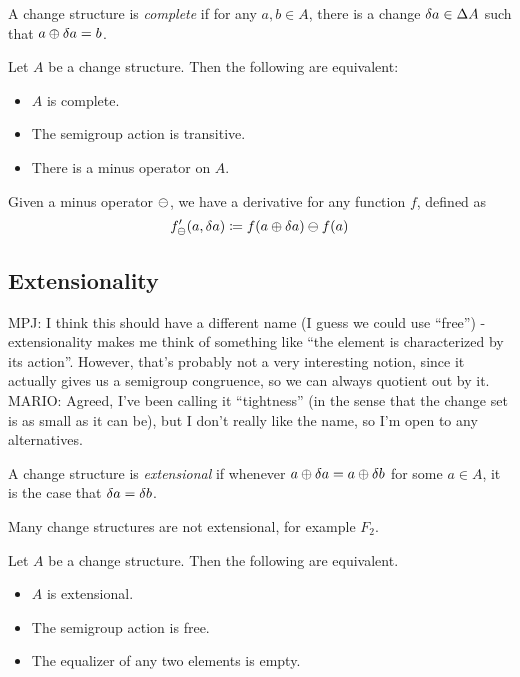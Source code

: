 \begin{defn}[Completeness]
  A change structure is \textit{complete} if for any $a, b \in A$, there is
  a change $\delta a \in \Delta A$ such that $a \oplus \delta a = b$.
\end{defn}

\begin{prop}
  Let $A$ be a change structure. Then the following are equivalent:
  \begin{itemize}
    \item $A$ is complete.
    \item The semigroup action is transitive.
    \item There is a minus operator on $A$.
  \end{itemize}
\end{prop}

\begin{defn}
  Given a minus operator $\ominus$, we have a derivative for any function $f$,
  defined as
  $$f'_\ominus(a, \delta a) \coloneqq f(a \oplus \delta a) \ominus f(a)$$
\end{defn}

\subsection{Extensionality}

MPJ: I think this should have a different name (I guess we could use ``free'') -
extensionality makes me think of something like ``the element is characterized
by its action''.
However, that's probably not a very interesting notion, since it actually gives us a
semigroup congruence, so we can always quotient out by it.
MARIO: Agreed, I've been calling it ``tightness'' (in the sense that the change set
is as small as it can be), but I don't really like the name, so I'm open to any
alternatives.
\begin{defn}[Extensionality]
  A change structure is \textit{extensional} if whenever $a \oplus \delta a
  = a \oplus \delta b$ for some $a \in A$, it is the case that $\delta a = \delta b$.
\end{defn}

Many change structures are not extensional, for example $F_2$.

\begin{prop}
  Let $A$ be a change structure. Then the following are equivalent.
  \begin{itemize}
    \item $A$ is extensional.
    \item The semigroup action is free.
    \item The equalizer of any two elements is empty.
  \end{itemize}
\end{prop}

